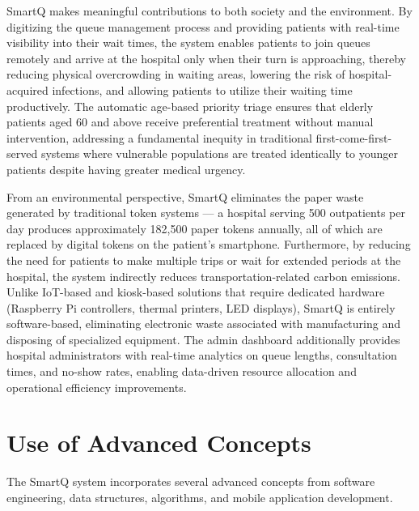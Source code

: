 \documentclass[12pt,a4paper]{article}
\begin{document}
SmartQ makes meaningful contributions to both society and the environment. By digitizing the queue management process and providing patients with real-time visibility into their wait times, the system enables patients to join queues remotely and arrive at the hospital only when their turn is approaching, thereby reducing physical overcrowding in waiting areas, lowering the risk of hospital-acquired infections, and allowing patients to utilize their waiting time productively. The automatic age-based priority triage ensures that elderly patients aged 60 and above receive preferential treatment without manual intervention, addressing a fundamental inequity in traditional first-come-first-served systems where vulnerable populations are treated identically to younger patients despite having greater medical urgency.

From an environmental perspective, SmartQ eliminates the paper waste generated by traditional token systems --- a hospital serving 500 outpatients per day produces approximately 182,500 paper tokens annually, all of which are replaced by digital tokens on the patient's smartphone. Furthermore, by reducing the need for patients to make multiple trips or wait for extended periods at the hospital, the system indirectly reduces transportation-related carbon emissions. Unlike IoT-based and kiosk-based solutions that require dedicated hardware (Raspberry Pi controllers, thermal printers, LED displays), SmartQ is entirely software-based, eliminating electronic waste associated with manufacturing and disposing of specialized equipment. The admin dashboard additionally provides hospital administrators with real-time analytics on queue lengths, consultation times, and no-show rates, enabling data-driven resource allocation and operational efficiency improvements.

\section{Use of Advanced Concepts}

The SmartQ system incorporates several advanced concepts from software engineering, data structures, algorithms, and mobile application development.
\end{document}
